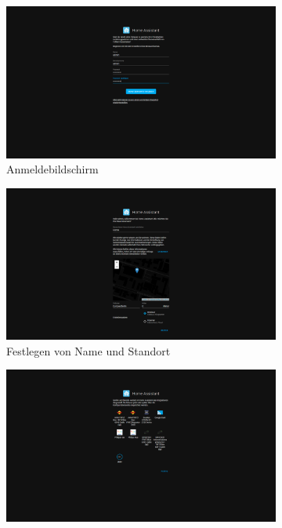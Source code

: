 \begin{figure}[H]
    \begin{subfigure}{.5\linewidth}
        \includegraphics[width=1\textwidth]{img/HA2.png}
        \caption[Anmeldebildschirm]{Anmeldebildschirm}
        \label{fig:ha1}
    \end{subfigure}
    \begin{subfigure}{.5\linewidth}
        \includegraphics[width=1\textwidth]{img/HA3.png}
        \caption[Festlegen von Name und Standort]{Festlegen von Name und Standort}
        \label{fig:ha2}
    \end{subfigure}
    \begin{subfigure}{.5\linewidth}
        \includegraphics[width=1\textwidth]{img/HA4.png}

\end{subfigure}
\end{figure}
